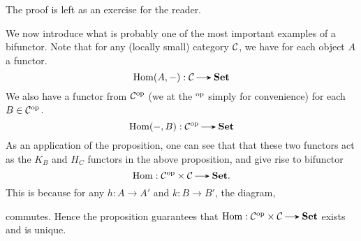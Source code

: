     The proof is left as an exercise for the reader.
   

    \begin{example}
    We now introduce what is probably one of the most important examples of 
    a bifunctor. Note that for any (locally small) category $\mathcal{C}$, 
    we have for each object $A$ a functor.
    \[
        \hom(A, -): \cc \to \textbf{Set}
    \]
    We also have a functor from $\mathcal{C}^{\mathrm{op}}$ (we at the $^{\mathrm{op}}$ simply for convenience)
    for each $B \in \mathcal{C}^{\mathrm{op}}$.
    \[
        \hom(-, B): \cc\op \to \textbf{Set}    
    \]
    As an application of the proposition,
    one can  see that that these two functors act as the $K_B$
    and $H_C$ functors in the above proposition, and give rise to
    bifunctor 
    \[ 
        \hom: \cc\op \times \cc \to \textbf{Set}.
    \] 
    This is
    because for any $h: A \to A'$ and $k: B \to B'$, the diagram,
    \begin{center}
    \end{center}
    commutes.
    Hence the proposition guarantees that $\hom:\cc\op\times\cc \to
    \textbf{Set}$ exists and is unique.
    \end{example}

